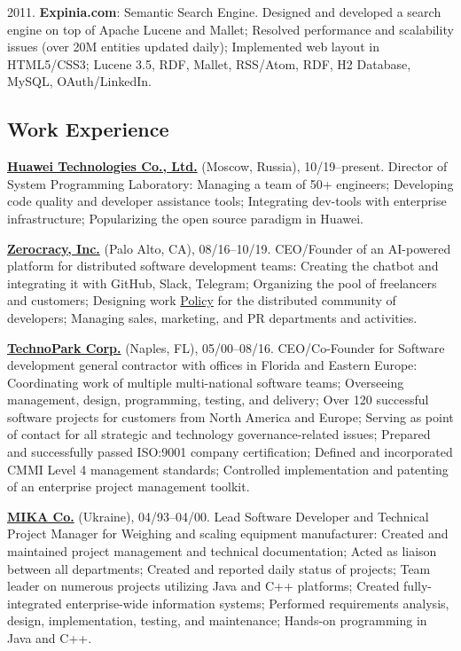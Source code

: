 \documentclass[12pt]{article}
\begin{document}
2011. \textbf{Expinia.com}: Semantic Search Engine.
Designed and developed a search engine on top of Apache Lucene and Mallet;
Resolved performance and scalability issues (over 20M entities updated daily);
Implemented web layout in HTML5/CSS3;
Lucene 3.5, RDF, Mallet, RSS/Atom, RDF, H2 Database, MySQL, OAuth/LinkedIn.

\subsection*{Work Experience}

\textbf{\href{https://www.huawei.com}{Huawei Technologies Co., Ltd.}} (Moscow, Russia), 10/19--present.
Director of System Programming Laboratory:
Managing a team of 50+ engineers;
Developing code quality and developer assistance tools;
Integrating dev-tools with enterprise infrastructure;
Popularizing the open source paradigm in Huawei.

\textbf{\href{https://www.zerocracy.com}{Zerocracy, Inc.}} (Palo Alto, CA), 08/16--10/19.
CEO/Founder of an AI-powered platform for distributed software development teams:
Creating the chatbot and integrating it with GitHub, Slack, Telegram;
Organizing the pool of freelancers and customers;
Designing work \href{https://www.zerocracy.com/policy.html}{Policy} for the distributed community of developers;
Managing sales, marketing, and PR departments and activities.

\textbf{\href{https://www.technoparkcorp.com}{TechnoPark Corp.}} (Naples, FL), 05/00--08/16.
CEO/Co-Founder for Software development general contractor with offices in Florida and Eastern Europe:
Coordinating work of multiple multi-national software teams;
Overseeing management, design, programming, testing, and delivery;
Over 120 successful software projects for customers from North America and Europe;
Serving as point of contact for all strategic and technology governance-related issues;
Prepared and successfully passed ISO:9001 company certification;
Defined and incorporated CMMI Level 4 management standards;
Controlled implementation and patenting of an enterprise project management toolkit.

\textbf{\href{http://www.mika.ua}{MIKA Co.}} (Ukraine), 04/93--04/00.
Lead Software Developer and Technical Project Manager for Weighing and scaling equipment manufacturer:
Created and maintained project management and technical documentation;
Acted as liaison between all departments;
Created and reported daily status of projects;
Team leader on numerous projects utilizing Java and C++ platforms;
Created fully-integrated enterprise-wide information systems;
Performed requirements analysis, design, implementation, testing, and maintenance;
Hands-on programming in Java and C++.
\end{document}
